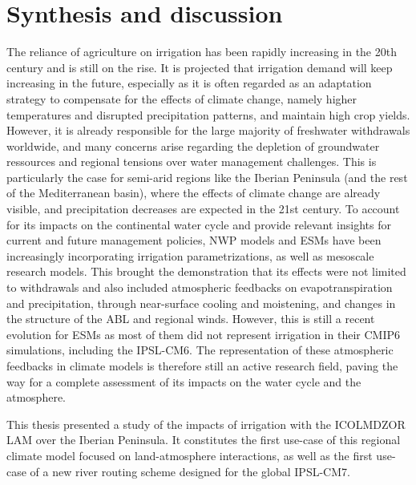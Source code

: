 \section{Synthesis and discussion}


The reliance of agriculture on irrigation has been rapidly increasing in the 20th century and is still on the rise. It is projected that irrigation demand will keep increasing in the future, especially as it is often regarded as an adaptation strategy to compensate for the effects of climate change, namely higher temperatures and disrupted precipitation patterns, and maintain high crop yields.
However, it is already responsible for the large majority of freshwater withdrawals worldwide, and many concerns arise regarding the depletion of groundwater ressources and regional tensions over water management challenges. This is particularly the case for semi-arid regions like the Iberian Peninsula (and the rest of the Mediterranean basin), where the effects of climate change are already visible, and precipitation decreases are expected in the 21st century.
To account for its impacts on the continental water cycle and provide relevant insights for current and future management policies, NWP models and ESMs have been increasingly incorporating irrigation parametrizations, as well as mesoscale research models.
This brought the demonstration that its effects were not limited to withdrawals and also included atmospheric feedbacks on evapotranspiration and precipitation, through near-surface cooling and moistening, and changes in the structure of the ABL and regional winds.
However, this is still a recent evolution for ESMs as most of them did not represent irrigation in their CMIP6 simulations, including the IPSL-CM6.
The representation of these atmospheric feedbacks in climate models is therefore still an active research field, paving the way for a complete assessment of its impacts on the water cycle and the atmosphere.

\hfill

This thesis presented a study of the impacts of irrigation with the ICOLMDZOR LAM over the Iberian Peninsula. 
It constitutes the first use-case of this regional climate model focused on land-atmosphere interactions, as well as the first use-case of a new river routing scheme designed for the global IPSL-CM7.

\hfill

